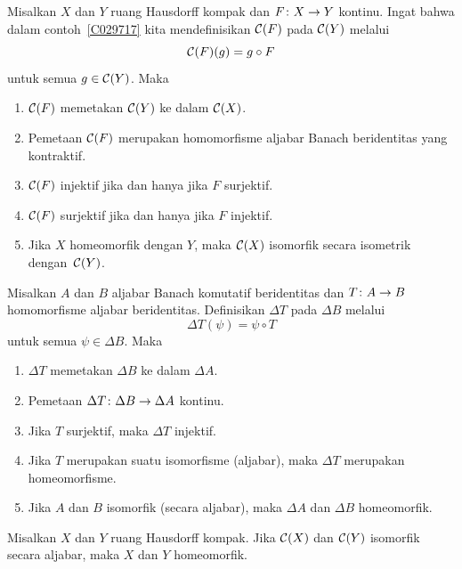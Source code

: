 \begin{prop}\label{000735} Misalkan $X$ dan $Y$ ruang Hausdorff kompak dan
$F \colon X \rightarrow Y$ kontinu. Ingat bahwa dalam contoh~\ref{C029717} kita mendefinisikan $\mathcal{C}(F)$
pada $\mathcal{C}(Y)$ melalui
   \[ \mathcal{C}(F)(g) = g \circ F\]
untuk semua $g \in \mathcal{C}(Y)$. Maka
  \begin{enumerate}[label=\rm{(\alph*)}]
   \item $\mathcal{C}(F)$ memetakan $\mathcal{C}(Y)$ ke dalam $\mathcal{C}(X)$.
   \item Pemetaan $\mathcal{C}(F)$ merupakan homomorfisme aljabar Banach beridentitas yang kontraktif.
   \item $\mathcal{C}(F)$ injektif jika dan hanya jika $F$ surjektif.
   \item $\mathcal{C}(F)$ surjektif jika dan hanya jika $F$ injektif.
   \item Jika $X$ homeomorfik dengan $Y$, maka $\mathcal{C}(X)$ isomorfik secara isometrik
   dengan~$\mathcal{C}(Y)$.
  \end{enumerate}
\end{prop}

\begin{prop}\label{000736} Misalkan $A$ dan $B$ aljabar Banach komutatif beridentitas dan
$T\colon A \rightarrow B$ homomorfisme aljabar beridentitas. Definisikan $\Delta T$ pada $\Delta B$ melalui
   \[ \Delta T(\psi) = \psi \circ T \]
untuk semua $\psi \in \Delta B$. Maka
  \begin{enumerate}[label=\rm{(\alph*)}]
   \item $\Delta T$ memetakan $\Delta B$ ke dalam $\Delta A$.
   \item Pemetaan $\Delta T\colon \Delta B \rightarrow \Delta A$ kontinu.
   \item Jika $T$ surjektif, maka $\Delta T$ injektif.
   \item Jika $T$ merupakan suatu isomorfisme (aljabar), maka $\Delta T$ merupakan homeomorfisme.
   \item Jika $A$ dan $B$ isomorfik (secara aljabar), maka $\Delta A$ dan $\Delta B$
   homeomorfik.
  \end{enumerate}
\end{prop}

\begin{cor} Misalkan $X$ dan $Y$ ruang Hausdorff kompak. Jika $\mathcal{C}(X)$ dan $\mathcal{C}(Y)$ isomorfik
secara aljabar, maka $X$ dan $Y$ homeomorfik.
\end{cor}

